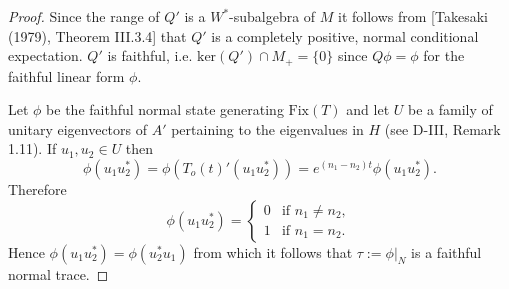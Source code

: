 \begin{proof}
Since the range of $Q'$ is a $W^*$-subalgebra of $M$ it follows from [Takesaki (1979), Theorem III.3.4] that $Q'$ is a completely positive, normal conditional expectation.
$Q'$ is faithful, i.e. $\text{ker}(Q') \cap M_{+} = \{0\}$ since $Q\phi = \phi$ for the faithful linear form $\phi$.

\newpage

Let $\phi$ be the faithful normal state generating $\text{Fix}(T)$ and let $U$ be a family of unitary eigenvectors of $A'$ pertaining to the eigenvalues in $H$ (see D-III, Remark 1.11).
If $u_{1}, u_{2} \in U$ then
\[
\phi(u_{1}u_{2}^*) = \phi(T_{o}(t)'(u_{1}u_{2}^*)) = e^{(n_{1}-n_{2})t}\phi(u_{1}u_{2}^*).
\]
Therefore
\[
\phi(u_{1}u_{2}^*) = \begin{cases} 0 & \text{if } n_{1} \neq n_{2}, \\ 1 & \text{if } n_{1} = n_{2}. \end{cases}
\]
Hence $\phi(u_{1}u_{2}^*) = \phi(u_{2}^*u_{1})$ from which it follows that $\tau := \phi|_{N}$ is a faithful normal trace.
\end{proof}


